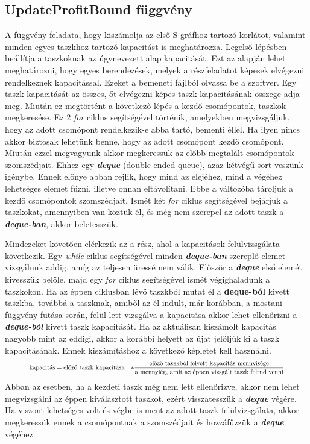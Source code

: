\subsection{UpdateProfitBound függvény}
A függvény feladata, hogy kiszámolja az első S-gráfhoz tartozó korlátot, valamint minden egyes taszkhoz tartozó kapacitást is meghatározza. Legelső lépésben beállítja a taszkoknak az úgynevezett alap kapacitását. Ezt az alapján lehet meghatározni, hogy egyes berendezések, melyek a részfeladatot képesek elvégezni rendelkeznek kapacitással. Ezeket a bemeneti fájlból olvassa be a szoftver. Egy taszk kapacitását az összes, őt elvégezni képes taszk kapacitásának összege adja meg. Miután ez megtörtént a következő lépés a kezdő csomópontok, taszkok megkeresése. Ez 2 \textit{for} ciklus segítségével történik, amelyekben megvizsgáljuk, hogy az adott csomópont rendelkezik-e abba tartó, bementi éllel. Ha ilyen nincs akkor biztosak lehetünk benne, hogy az adott csomópont kezdő csomópont. Miután ezzel megvagyunk akkor megkeressük az előbb megtalált csomópontok szomszédjait. Ehhez egy \textbf{\textit{deque}} (double-ended queue), azaz kétvégű sort veszünk igénybe. Ennek előnye abban rejlik, hogy mind az elejéhez, mind a végéhez lehetséges elemet fűzni, illetve onnan eltávolítani. Ebbe a változóba tároljuk a kezdő csomópontok szomszédjait. Ismét két \textit{for} ciklus segítségével bejárjuk a taszkokat, amennyiben van köztük él, és még nem szerepel az adott taszk a \textbf{\textit{deque-ban}}, akkor beletesszük.

Mindezeket követően elérkezik az a rész, ahol a kapacitások felülvizsgálata következik. Egy \textit{while} ciklus segítségével minden \textbf{\textit{deque-ban}} szereplő elemet vizsgálunk addig, amíg az teljesen üressé nem válik. Először a \textbf{\textit{deque}} első elemét kivesszük belőle, majd egy \textit{for} ciklus segítségével ismét végighaladunk a taszkokon. Ha az éppen ciklusban lévő taszkból mutat él a \textbf{deque-ból} kivett taszkba, továbbá a taszknak, amiből az él indult, már korábban, a mostani függvény futása során, felül lett vizsgálva a kapacitása akkor lehet ellenőrizni a \textbf{\textit{deque-ból}} kivett taszk kapacitását. Ha az aktuálisan kiszámolt kapacitás nagyobb mint az eddigi, akkor a korábbi helyett az újat jelöljük ki a taszk kapacitásának. Ennek kiszámításhoz a következő képletet kell használni.
\begin{gather}
\scalebox{0.75}{$
\begin{align*}
\text{kapacitás}&= \text{előző taszk kapacitása}&*\frac{\text{előző taszkból felvett kapacitás mennyisége}}{\text{a mennyiég, amit az éppen vizsgált taszk feltud venni}}
\end{align*}$}	
\end{gather}
Abban az esetben, ha a kezdeti taszk még nem lett ellenőrizve, akkor nem lehet megvizsgálni az éppen kiválasztott taszkot, ezért visszatesszük a \textbf{\textit{deque}} végére. Ha viszont lehetséges volt és végbe is ment az adott taszk felülvizsgálata, akkor megkeressük ennek a csomópontnak a szomszédjait és hozzáfűzzük a \textbf{\textit{deque}} végéhez.

